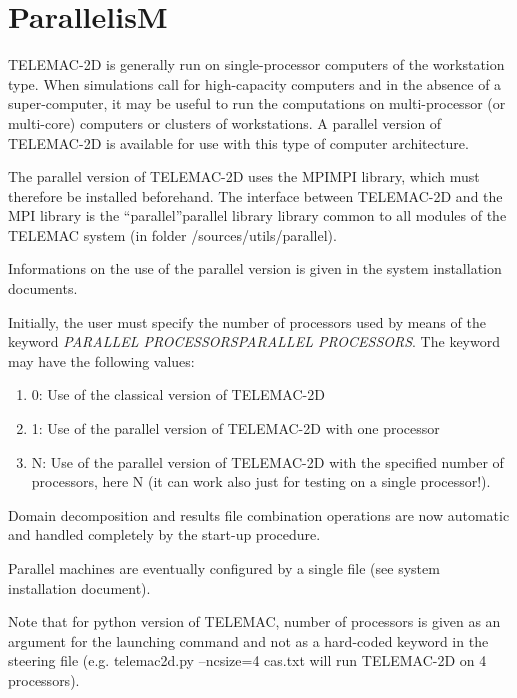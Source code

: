\documentclass{article} %
\begin{document}
\section{  ParallelisM}

 TELEMAC-2D is generally run on single-processor computers of the workstation type. When simulations call for high-capacity computers and in the absence of a super-computer, it may be useful to run the computations on multi-processor (or multi-core) computers or clusters of workstations. A parallel version of TELEMAC-2D is available for use with this type of computer architecture.

 The parallel version of TELEMAC-2D uses the MPIMPI library, which must therefore be installed beforehand. The interface between TELEMAC-2D and the MPI library is the ``parallel''parallel library library common to all modules of the TELEMAC system (in folder /sources/utils/parallel).

 Informations on the use of the parallel version is given in the system installation documents.

 Initially, the user must specify the number of processors used by means of the keyword \textit{PARALLEL PROCESSORSPARALLEL PROCESSORS}. The keyword may have the following values:

\begin{enumerate}
\item  0: Use of the classical version of TELEMAC-2D

\item  1: Use of the parallel version of TELEMAC-2D with one processor

\item  N: Use of the parallel version of TELEMAC-2D with the specified number of processors, here N (it can work also just for testing on a single processor!).
\end{enumerate}

 Domain decomposition and results file combination operations are now automatic and handled completely by the start-up procedure.

 Parallel machines are eventually configured by a single file (see system installation document).

 Note that for python version of TELEMAC, number of processors is given as an argument for the launching command and not as a hard-coded keyword in the steering file (e.g. telemac2d.py --ncsize=4 cas.txt will run TELEMAC-2D on 4 processors).
\end{document}
